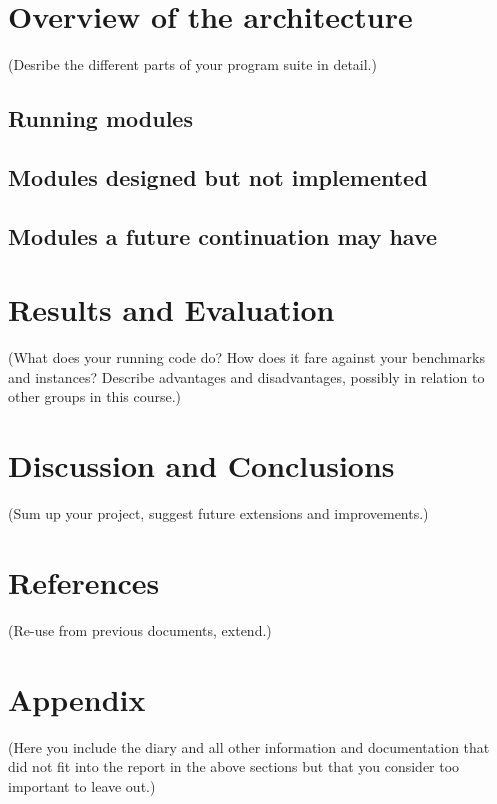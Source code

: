 \documentclass[a4paper,11pt]{article}
\begin{document}
\section{Overview of the architecture}
 (Desribe the different parts of your program suite in detail.)
\subsection{Running modules }
\subsection{Modules designed but not implemented}
\subsection{Modules a future continuation may have}

\section{Results and Evaluation}
(What does your running code do? How does it fare against your
benchmarks and instances? Describe advantages and disadvantages,
possibly in relation to other groups in this course.)


\section{Discussion and Conclusions}
(Sum up your project, suggest future extensions and improvements.)


\section{References}
(Re-use from previous documents, extend.)

\section{Appendix}
(Here you include the diary and all other information and
documentation that did not fit into the report in the above sections
but
that you consider too important to leave out.)
\end{document}
